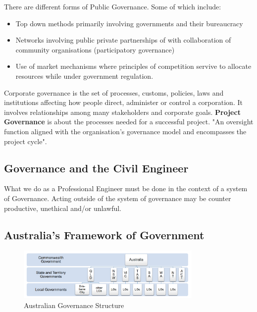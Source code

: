 \documentclass{report}
\begin{document}
	There are different forms of Public Governance. Some of which include:

	\begin{itemize}
		\item Top down methods primarily involving governments and their bureaucracy
		\item Networks involving public private partnerships of with collaboration of community organisations (participatory governance)
		\item Use of market mechanisms where principles of competition servive to allocate resources while under government regulation. 
	\end{itemize}

	Corporate governance is the set of processes, customs, policies, laws and institutions affecting how people direct, administer or control a corporation. It involves relationships among many stakeholders and corporate goals. \textbf{Project Governance} is about the processes needed for a successful project. "An oversight function aligned with the organisation's governance model and encompasses the project cycle". 

	\subsection{Governance and the Civil Engineer}
	What we do as a Professional Engineer must be done in the context of a system of Governance. Acting outside of the system of governance may be counter productive, unethical and/or unlawful.

	\newpage
	\subsection{Australia's Framework of Government}

	\begin{figure}[htbp]
		\centering
			\includegraphics[width=0.8\textwidth]{images/figures/govstructure.png}
		\caption{Australian Governance Structure}
		\label{fig:your_label}
	\end{figure}
\end{document}
